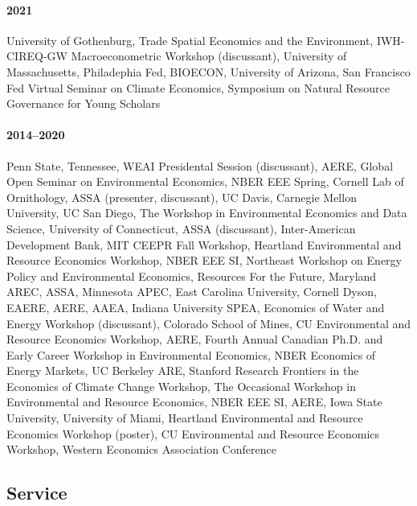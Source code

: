 \documentclass[11pt]{res} %
\begin{document}
\begin{resume}
\paragraph{2021} University of Gothenburg, Trade Spatial Economics and the Environment, IWH-CIREQ-GW Macroeconometric Workshop (discussant), University of Massachusetts, Philadephia Fed, BIOECON, University of Arizona, San Francisco Fed Virtual Seminar on Climate Economics, Symposium on Natural Resource Governance for Young Scholars \vspace{-.3in}
\paragraph{2014--2020} Penn State, Tennessee, WEAI Presidental Session (discussant), AERE, Global Open Seminar on Environmental Economics, NBER EEE Spring, Cornell Lab of Ornithology, ASSA (presenter, discussant), UC Davis, Carnegie Mellon University, UC San Diego, The Workshop in Environmental Economics and Data Science, University of Connecticut, ASSA (discussant), Inter-American Development Bank, MIT CEEPR Fall Workshop, Heartland Environmental and Resource Economics Workshop, NBER EEE SI, Northeast Workshop on Energy Policy and Environmental Economics, Resources For the Future, Maryland AREC, ASSA, Minnesota APEC, East Carolina University, Cornell Dyson, EAERE, AERE, AAEA, Indiana University SPEA, Economics of Water and Energy Workshop (discussant), Colorado School of Mines, CU Environmental and Resource Economics Workshop, AERE, Fourth Annual Canadian Ph.D. and Early Career Workshop in Environmental Economics, NBER Economics of Energy Markets, UC Berkeley ARE, Stanford Research Frontiers in the Economics of Climate Change Workshop, The Occasional Workshop in Environmental and Resource Economics, NBER EEE SI, AERE, Iowa State University, University of Miami, Heartland Environmental and Resource Economics Workshop (poster), CU Environmental and Resource Economics Workshop, Western Economics Association Conference

\vspace{-.2in}

\subsection{Service}\vspace{-.2in}

\end{resume}
\end{document}
